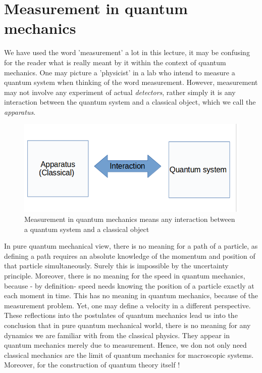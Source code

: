      \section{Measurement in quantum mechanics}
     We have used the word 'measurement' a lot in this lecture, it may be confusing for the reader what is really meant by it within the context of quantum mechanics. One may picture  a 'physicist' in a lab who intend to measure a quantum system when thinking of the word measurement. However, measurement may not involve any experiment of actual \textit{detectors}, rather simply it is any interaction between the quantum system and a classical object, which we call the \textit{apparatus}.\\
     \begin{figure}[h]
     	\includegraphics[width = 0.9 \textwidth]{./figures/mes}
     	\caption{Measurement in quantum mechanics means any interaction between a quantum system and a classical object}
     \end{figure}
     In pure quantum mechanical view, there is no meaning for a path of a particle, as defining a path requires an absolute knowledge of the momentum and position of that particle simultaneously. Surely this is impossible by the uncertainty principle. Moreover, there is no meaning for the speed in quantum mechanics, because - by definition- speed needs knowing the position of a particle exactly at each moment in time. This has no meaning in quantum mechanics, because of the measurement problem. Yet, one may define a velocity in a different perspective.\\ These reflections into the postulates of quantum mechanics lead us into the conclusion that in pure quantum mechanical world, there is no meaning for any dynamics we are familiar with from the classical physics. They appear in quantum mechanics merely due to measurement. Hence, we don not only need classical mechanics are the limit of quantum mechanics for macroscopic systems. Moreover, for the construction of quantum theory itself ! 
